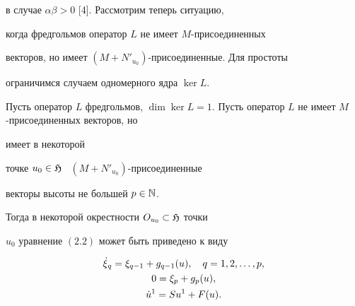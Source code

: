 в случае $\alpha\beta>0$ [4]. Рассмотрим теперь ситуацию,


когда фредгольмов оператор $L$ не имеет $M$-присоединенных


векторов, но имеет $(M+N'_{u_{0}})$-присоединенные. Для простоты


ограничимся случаем одномерного ядра $\ker L$.








\begin{thms}


Пусть оператор $L$ фредгольмов, $\dim\ker


L=1$. Пусть оператор $L$ не имеет  $M$-присоединенных векторов, но


имеет в некоторой 


точке $u_{0}\in\frak H$ \ $(M+N'_{u_{0}})$-присоединенные 


векторы высоты не большей $p\in\Bbb N$.


Тогда в некоторой окрестности $O_{u_{0}}\subset\frak H$ точки


$u_{0}$ уравнение $(2.2)$ может быть приведено  к виду


\begin{gather}


\Dot\xi{}_{q}=\xi_{q-1}+g_{q-1}(u),\quad q=1,2,\dotsc,p,\notag\\


0=\xi_{p}+g_{p}(u),\\


\Dot u{}^{1}=Su^{1}+F(u).\notag


\end{gather}


\end{thms}








